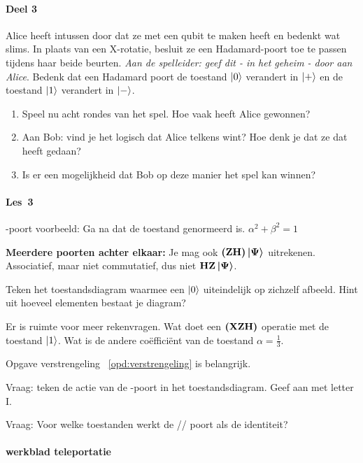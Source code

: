\documentclass[../../main.tex]{subfiles}
\begin{document}
\paragraph*{Deel 3}
Alice heeft intussen door dat ze met een qubit te maken heeft en bedenkt wat slims. In plaats van een X-rotatie, besluit ze een Hadamard-poort toe te passen tijdens haar beide beurten. \textit{Aan de spelleider: geef dit - in het geheim - door aan Alice}. 
Bedenk dat een Hadamard poort de toestand $\ket{0}$ verandert in $\ket{+}$ en de toestand $\ket{1}$ verandert in $\ket{-}$.
\begin{enumerate}
\item Speel nu acht rondes van het spel. Hoe vaak heeft Alice gewonnen?
\item Aan Bob: vind je het logisch dat Alice telkens wint? Hoe denk je dat ze dat heeft gedaan?
\item Is er een mogelijkheid dat Bob op deze manier het spel kan winnen?
\end{enumerate}

\paragraph{Les~3}
-poort voorbeeld: Ga na dat de toestand genormeerd is. $\alpha^2+\beta^2=1$

\textbf{Meerdere poorten achter elkaar:} Je mag ook $(\port{Z}\port{H})\ket{\Psi}$
 uitrekenen. Associatief, maar niet commutatief, dus niet $\port{H}\port{Z}\ket{\Psi}$.
 
Teken het toestandsdiagram waarmee een  $\ket{0}$ uiteindelijk op zichzelf afbeeld. Hint uit hoeveel elementen bestaat je diagram?
  
Er is ruimte voor meer rekenvragen. Wat doet een $(\port{X}\port{Z}\port{H})$ operatie met de toestand $\ket{1}$. Wat is de andere co\"effici\"ent van de toestand $\alpha=\tfrac{1}{3}$.


Opgave verstrengeling ~\ref{opd:verstrengeling} is belangrijk.

Vraag: teken de actie van de -poort in het toestandsdiagram. Geef aan met letter I.

Vraag: Voor welke toestanden werkt de // poort als de identiteit?

\paragraph*{werkblad teleportatie}
\end{document}
